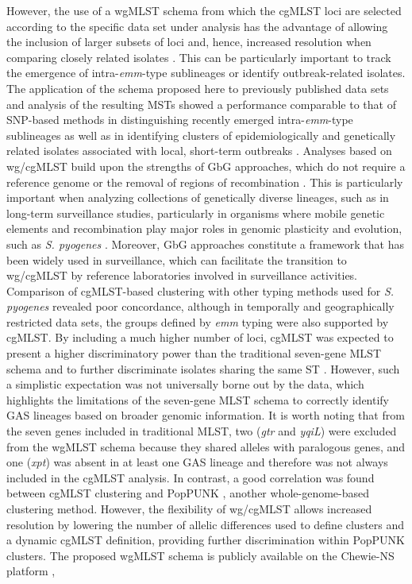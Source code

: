 However, the use of a \ac{wgMLST} schema from which the \ac{cgMLST} loci are selected according to the specific data set under analysis has the advantage of allowing the inclusion of larger subsets of loci and, hence, increased resolution when comparing closely related isolates \cite{maiden_mlst_2013}. This can be particularly important to track the emergence of intra-\textit{emm}-type sublineages or identify outbreak-related isolates. The application of the schema proposed here to previously published data sets and analysis of the resulting \ac{MST}s showed a performance comparable to that of \ac{SNP}-based methods in distinguishing recently emerged intra-\textit{emm}-type sublineages as well as in identifying clusters of epidemiologically and genetically related isolates associated with local, short-term outbreaks \cite{turner_emergence_2015, lynskey_emergence_2019, coelho_genomic_2019}. Analyses based on \ac{wg/cgMLST} build upon the strengths of \ac{GbG} approaches, which do not require a reference genome or the removal of regions of recombination \cite{maiden_mlst_2013, neumann_core_2019, leopold_bacterial_2014}. This is particularly important when analyzing collections of genetically diverse lineages, such as in long-term surveillance studies, particularly in organisms where mobile genetic elements and recombination play major roles in genomic plasticity and evolution, such as \textit{S. pyogenes} \cite{davies_atlas_2019, mcgregor_multilocus_2004}. Moreover, \ac{GbG} approaches constitute a framework that has been widely used in surveillance, which can facilitate the transition to \ac{wg/cgMLST} by reference laboratories involved in surveillance activities. Comparison of \ac{cgMLST}-based clustering with other typing methods used for \textit{S. pyogenes} revealed poor concordance, although in temporally and geographically restricted data sets, the groups defined by \textit{emm} typing were also supported by \ac{cgMLST}. By including a much higher number of loci, \ac{cgMLST} was expected to present a higher discriminatory power than the traditional seven-gene \ac{MLST} schema and to further discriminate isolates sharing the same \ac{ST} \cite{neumann_core_2019, bletz_defining_2018}. However, such a simplistic expectation was not universally borne out by the data, which highlights the limitations of the seven-gene \ac{MLST} schema to correctly identify \ac{GAS} lineages based on broader genomic information. It is worth noting that from the seven genes included in traditional \ac{MLST}, two (\textit{gtr} and \textit{yqiL}) were excluded from the \ac{wgMLST} schema because they shared alleles with paralogous genes, and one (\textit{xpt}) was absent in at least one \ac{GAS} lineage and therefore was not always included in the \ac{cgMLST} analysis. In contrast, a good correlation was found between \ac{cgMLST} clustering and \ac{PopPUNK} \cite{davies_atlas_2019, lees_fast_2019}, another whole-genome-based clustering method. However, the flexibility of \ac{wg/cgMLST} allows increased resolution by lowering the number of allelic differences used to define clusters and a dynamic \ac{cgMLST} definition, providing further discrimination within \ac{PopPUNK} clusters. The proposed \ac{wgMLST} schema is publicly available on the \ac{Chewie-NS} platform \cite{mamede_chewie_2021}, 